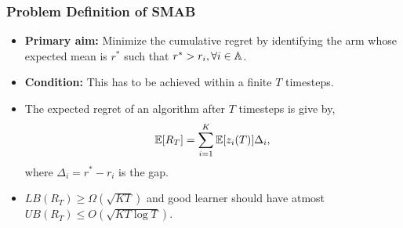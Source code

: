 




\begin{frame}
\frametitle{Problem Definition of SMAB}
\begin{itemize}
\item<1-> \textbf{Primary aim:} Minimize the cumulative regret by identifying the arm whose expected mean is $r^*$ such that $r^* > r_i,\forall i\in\mathbb{A}$.
\item<2-> \textbf{Condition:} This has to be achieved within a finite $T$ timesteps.
\item<3-> The expected regret of an algorithm after $T$ timesteps is give by,
\begin{align*}
\mathbb{E}[R_{T}]= \sum_{i=1}^{K} \mathbb{E}[z_i (T)] \Delta_i,
\end{align*}
where $\Delta_{i}=r^{*}-r_{i}$ is the gap.
\item<4-> $LB(R_T) \geq \Omega\left( \sqrt{KT}\right)$ and good learner should have atmost $UB(R_T) \leq O\left( \sqrt{KT\log T}\right)$.
\end{itemize}
\end{frame}

%
%

